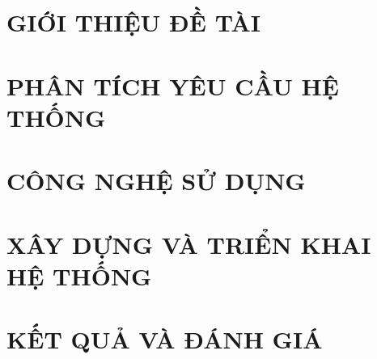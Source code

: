 \documentclass[a4paper,12pt,oneside]{report}
\theoremstyle{definition}
\begin{document}


\newpage
{}

\pagestyle{fancy}
\fancyhf{}
\fancyhead[L]{\leftmark}
\fancyfoot[R]{\thepage}

\chapter{GIỚI THIỆU ĐỀ TÀI}
\label{chapter:Introduction}

\newpage
\chapter{PHÂN TÍCH YÊU CẦU HỆ THỐNG}
\label{chapter:Related_works}



\newpage
\chapter{CÔNG NGHỆ SỬ DỤNG}
\label{chapter:Methodology}


\newpage
\chapter{XÂY DỰNG VÀ TRIỂN KHAI HỆ THỐNG}
\label{chapter:Experiment}


\newpage
\chapter{KẾT QUẢ VÀ ĐÁNH GIÁ}
\label{chapter:SolutionAndContribution}


% 
\end{document}

